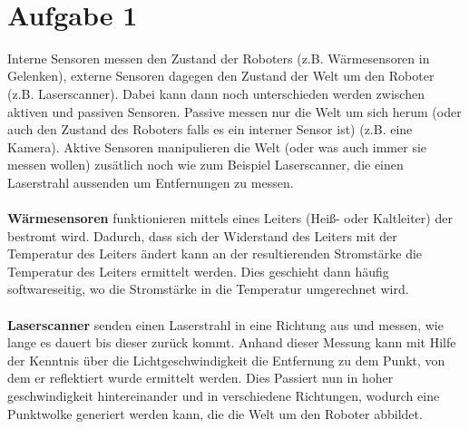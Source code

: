 \documentclass{../Vorlage/mat}
\begin{document}
 \\

\section*{Aufgabe 1}
Interne Sensoren messen den Zustand der Roboters (z.B. Wärmesensoren in Gelenken), externe Sensoren dagegen den Zustand der Welt um den Roboter (z.B. Laserscanner). Dabei kann dann noch unterschieden werden zwischen aktiven und passiven Sensoren. Passive messen nur die Welt um sich herum (oder auch den Zustand des Roboters falls es ein interner Sensor ist) (z.B. eine Kamera). Aktive Sensoren manipulieren die Welt (oder was auch immer sie messen wollen) zusätlich noch wie zum Beispiel Laserscanner, die einen Laserstrahl aussenden um Entfernungen zu messen.\\
\\
\textbf{Wärmesensoren} funktionieren mittels eines Leiters (Heiß- oder Kaltleiter) der bestromt wird. Dadurch, dass sich der Widerstand des Leiters mit der Temperatur des Leiters ändert kann an der resultierenden Stromstärke die Temperatur des Leiters ermittelt werden. Dies geschieht dann häufig softwareseitig, wo die Stromstärke in die Temperatur umgerechnet wird.\\
\\
\textbf{Laserscanner} senden einen Laserstrahl in eine Richtung aus und messen, wie lange es dauert bis dieser zurück kommt. Anhand dieser Messung kann mit Hilfe der Kenntnis über die Lichtgeschwindigkeit die Entfernung zu dem Punkt, von dem er reflektiert wurde ermittelt werden. Dies Passiert nun in hoher geschwindigkeit hintereinander und in verschiedene Richtungen, wodurch eine Punktwolke generiert werden kann, die die Welt um den Roboter abbildet.
\end{document}
